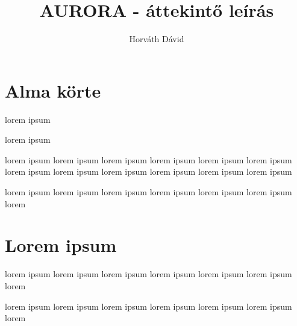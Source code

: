 \documentclass[]{article}
\title{AURORA - áttekintő leírás}
\author{Horváth Dávid}
\begin{document}
\maketitle

\tableofcontents

\newpage

\section{Alma körte}

  lorem ipsum
  
  lorem ipsum
  
  lorem ipsum lorem ipsum lorem ipsum lorem ipsum
  lorem ipsum lorem ipsum lorem ipsum lorem ipsum
  lorem ipsum lorem ipsum lorem ipsum lorem ipsum
  
  lorem ipsum lorem ipsum lorem ipsum lorem ipsum
  lorem ipsum lorem ipsum lorem
  
\section{Lorem ipsum}
  
  lorem ipsum lorem ipsum lorem ipsum lorem ipsum
  lorem ipsum lorem ipsum lorem
  
  lorem ipsum lorem ipsum lorem ipsum lorem ipsum
  lorem ipsum lorem ipsum lorem
  
\end{document}
